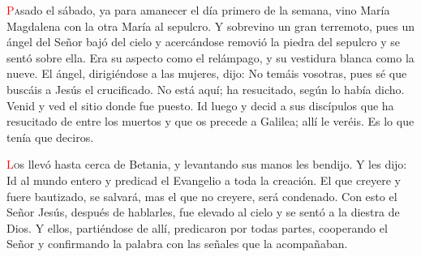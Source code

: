\documentclass[10pt,twoside]{book}
\begin{document}
\vspace{0.5em}

{}

\vspace{0.5em}

\iralfinal

\vspace{1.5em}

\noindent{}

\vspace{1.5em}

\noindent{}
\lettrine[lines=2]{\textcolor{red}{P}}asado el sábado, ya para amanecer el día primero de la semana, vino María Magdalena con la otra María al sepulcro. Y sobrevino un gran terremoto,
pues un ángel del Señor bajó del cielo y acercándose removió la piedra del sepulcro y se sentó sobre ella. Era su aspecto como el relámpago, y su vestidura blanca como la nueve.
El ángel, dirigiéndose a las mujeres, dijo: No temáis vosotras, pues sé que buscáis a Jesús el crucificado. No está aquí; ha resucitado, según lo había dicho.
Venid y ved el sitio donde fue puesto. Id luego y decid a sus discípulos que ha resucitado de entre los muertos y que os precede a Galilea; allí le veréis.
Es lo que tenía que deciros.

\vspace{0.5em}



\vspace{1.5em}

\noindent{}
\lettrine[lines=2]{\textcolor{red}{L}}os llevó hasta cerca de Betania, y levantando sus manos les bendijo. Y les dijo: Id al mundo entero y predicad el Evangelio a toda la creación.
El que creyere y fuere bautizado, se salvará, mas el que no creyere, será condenado. Con esto el Señor Jesús, después de hablarles, fue elevado al cielo y se sentó a la diestra de Dios.
Y ellos, partiéndose de allí, predicaron por todas partes, cooperando el Señor y confirmando la palabra con las señales que la acompañaban.
\end{document}
